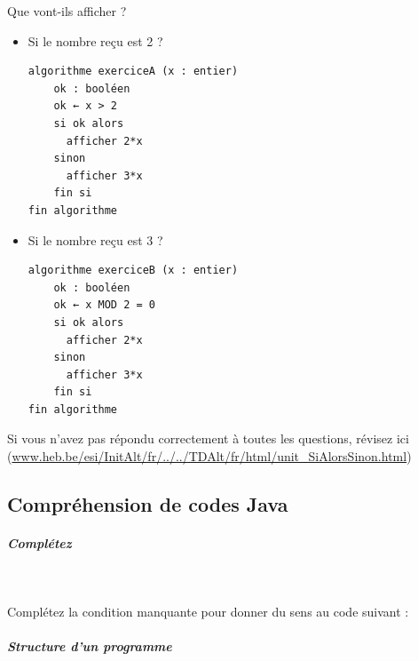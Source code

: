 \documentclass[11pt,a4paper]{article}
\begin{document}
							  Que vont-ils afficher ?
              
					\begin{itemize}
				
			\item Si le nombre re\c cu est 2 ? 
            \par
        \begin{verbatim}
algorithme exerciceA (x : entier)
    ok : booléen
    ok ← x > 2
    si ok alors
      afficher 2*x
    sinon
      afficher 3*x
    fin si
fin algorithme
				\end{verbatim} \textcolor{gray}{\underline{\hspace*{1em}}} 
			\item Si le nombre re\c cu est 3 ? 
            \par
        \begin{verbatim}
algorithme exerciceB (x : entier)
    ok : booléen
    ok ← x MOD 2 = 0
    si ok alors
      afficher 2*x
    sinon
      afficher 3*x
    fin si
fin algorithme
				\end{verbatim} \textcolor{gray}{\underline{\hspace*{1em}}} 
					\end{itemize}
				Si vous n'avez pas r\'epondu correctement \`a toutes les questions, 
        r\'evisez ici (\url{www.heb.be/esi/InitAlt/fr/../../TDAlt/fr/html/unit\_SiAlorsSinon.html})
            \par
        \subsection{Compr\'ehension de codes Java}
			
		\subparagraph{Compl\'etez} 
		
                \textcolor{white}{.} \par
            
								Compl\'etez la condition manquante pour donner du sens au code suivant :
							
            \par
			
		\subparagraph{Structure d'un programme} 
		
\end{document}
